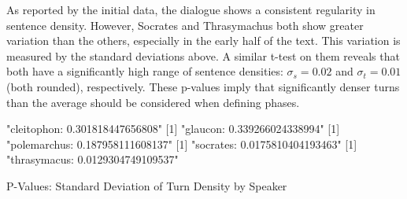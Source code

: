 \documentclass[noraggedright]{turabian-researchpaper}
\begin{document}
As reported by the initial data, the dialogue shows a consistent regularity in
sentence density. However, Socrates and Thrasymachus both show greater variation
than the others, especially in the early half of the text. 
This variation is measured by the standard deviations above. A similar t-test on
them reveals that both have a significantly high range of sentence densities:
$\sigma_s = 0.02$ and $\sigma_t = 0.01$ (both rounded), respectively. These
p-values imply that significantly denser turns than the average should be
considered when defining phases.

\begin{table}
\begin{Schunk}
\begin{Soutput}
[1] "cleitophon: 0.301818447656808"
[1] "glaucon: 0.339266024338994"
[1] "polemarchus: 0.187958111608137"
[1] "socrates: 0.0175810404193463"
[1] "thrasymacus: 0.0129304749109537"
\end{Soutput}
\end{Schunk}
\caption{P-Values: Standard Deviation of Turn Density by Speaker}
\label{tab:SDPval}
\end{table}
\end{document}
